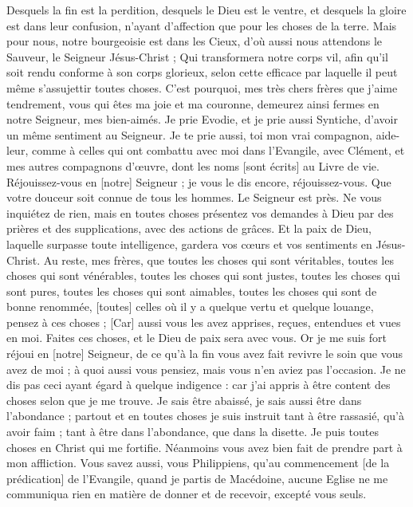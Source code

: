 \begin{multicols}{2}
Desquels la fin est la perdition, desquels le Dieu est le ventre, et desquels la gloire est dans leur confusion, n'ayant d'affection que pour les choses de la terre.
Mais pour nous, notre bourgeoisie est dans les Cieux, d'où aussi nous attendons le Sauveur, le Seigneur Jésus-Christ ;
Qui transformera notre corps vil, afin qu'il soit rendu conforme à son corps glorieux, selon cette efficace par laquelle il peut même s'assujettir toutes choses.
\VerseOne{}C'est pourquoi, mes très chers frères que j'aime tendrement, vous qui êtes ma joie et ma couronne, demeurez ainsi fermes en notre Seigneur, mes bien-aimés.
Je prie Evodie, et je prie aussi Syntiche, d'avoir un même sentiment au Seigneur.
Je te prie aussi, toi mon vrai compagnon, aide-leur, comme à celles qui ont combattu avec moi dans l'Evangile, avec Clément, et mes autres compagnons d'œuvre, dont les noms [sont écrits] au Livre de vie.
Réjouissez-vous en [notre] Seigneur ; je vous le dis encore, réjouissez-vous.
Que votre douceur soit connue de tous les hommes. Le Seigneur est près.
Ne vous inquiétez de rien, mais en toutes choses présentez vos demandes à Dieu par des prières et des supplications, avec des actions de grâces.
Et la paix de Dieu, laquelle surpasse toute intelligence, gardera vos cœurs et vos sentiments en Jésus-Christ.
Au reste, mes frères, que toutes les choses qui sont véritables, toutes les choses qui sont vénérables, toutes les choses qui sont justes, toutes les choses qui sont pures, toutes les choses qui sont aimables, toutes les choses qui sont de bonne renommée, [toutes] celles où il y a quelque vertu et quelque louange, pensez à ces choses ;
[Car] aussi vous les avez apprises, reçues, entendues et vues en moi. Faites ces choses, et le Dieu de paix sera avec vous.
Or je me suis fort réjoui en [notre] Seigneur, de ce qu'à la fin vous avez fait revivre le soin que vous avez de moi ; à quoi aussi vous pensiez, mais vous n’en aviez pas l'occasion.
Je ne dis pas ceci ayant égard à quelque indigence : car j'ai appris à être content des choses selon que je me trouve.
Je sais être abaissé, je sais aussi être dans l'abondance ; partout et en toutes choses je suis instruit tant à être rassasié, qu'à avoir faim ; tant à être dans l'abondance, que dans la disette.
Je puis toutes choses en Christ qui me fortifie.
Néanmoins vous avez bien fait de prendre part à mon affliction.
Vous savez aussi, vous Philippiens, qu'au commencement [de la prédication] de l'Evangile, quand je partis de Macédoine, aucune Eglise ne me communiqua rien en matière de donner et de recevoir, excepté vous seuls.

\end{multicols}
